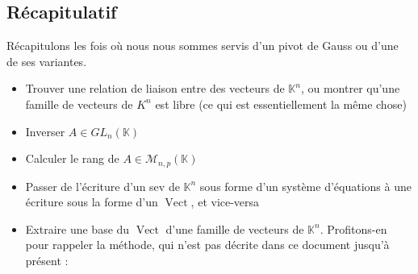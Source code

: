 \documentclass[french]{book}
\newcommand{\K}{\mathbb{K}}
\theoremstyle{plain}
\theoremstyle{definition}
\theoremstyle{remark}
\DeclareMathOperator{\vect}{Vect}
\begin{document}
\subsection{Récapitulatif}
Récapitulons les fois où nous nous sommes servis d'un pivot de Gauss ou d'une de ses variantes. \begin{itemize}
	\item Trouver une relation de liaison entre des vecteurs de $\K^n$, ou montrer qu'une famille de vecteurs de $K^n$ est libre (ce qui est essentiellement la même chose)
	\item Inverser $A\in GL_n(\K)$
	\item Calculer le rang de $A\in\mathcal{M}_{n,p}(\K)$
	\item Passer de l'écriture d'un sev de $\K^n$ sous forme d'un système d'équations à une écriture sous la forme d'un $\vect$, et vice-versa
	\item Extraire une base du $\vect$ d'une famille de vecteurs de $\K^n$. Profitons-en pour rappeler la méthode, qui n'est pas décrite dans ce document jusqu'à présent : 
\end{itemize}
\end{document}
